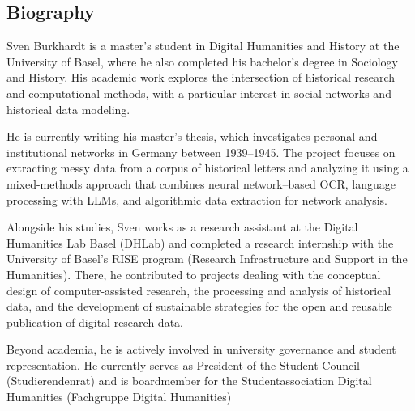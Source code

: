 \documentclass[11pt
]{article}
\begin{document}
\subsection{Biography}

Sven Burkhardt is a master’s student in Digital Humanities and History at the University of Basel, where he also completed his bachelor’s degree in Sociology and History. His academic work explores the intersection of historical research and computational methods, with a particular interest in social networks and historical data modeling.

He is currently writing his master’s thesis, which investigates personal and institutional networks in Germany between 1939–1945. The project focuses on extracting messy data from a corpus of historical letters and analyzing it using a mixed-methods approach that combines neural network–based OCR, language processing with LLMs, and algorithmic data extraction for network analysis.

Alongside his studies, Sven works as a research assistant at the Digital Humanities Lab Basel (DHLab) and completed a research internship with the University of Basel’s RISE program (Research Infrastructure and Support in the Humanities). There, he contributed to projects dealing with the conceptual design of computer-assisted research, the processing and analysis of historical data, and the development of sustainable strategies for the open and reusable publication of digital research data.

Beyond academia, he is actively involved in university governance and student representation. He currently serves as President of the Student Council (Studierendenrat) and is boardmember for the Studentassociation Digital Humanities (Fachgruppe Digital Humanities)
\end{document}
